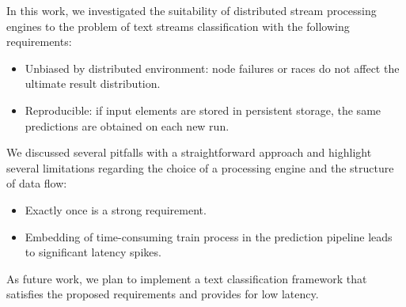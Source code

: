 \label {fs-short-conclusion}

In this work, we investigated the suitability of distributed stream processing engines to the problem of text streams classification with the following requirements:

\begin{itemize}
    \item Unbiased by distributed environment: node failures or races do not affect the ultimate result distribution.
    \item Reproducible: if input elements are stored in persistent storage, the same predictions are obtained on each new run.
\end{itemize}

We discussed several pitfalls with a straightforward approach and highlight several limitations regarding the choice of a processing engine and the structure of data flow:

\begin{itemize}
    \item Exactly once is a strong requirement.
    \item Embedding of time-consuming train process in the prediction pipeline leads to significant latency spikes.
\end{itemize}

As future work, we plan to implement a text classification framework that satisfies the proposed requirements and provides for low latency.
